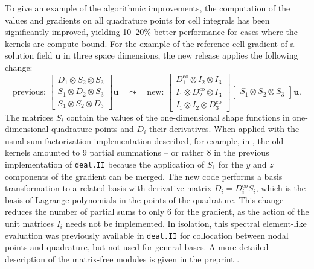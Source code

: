 \documentclass{ansarticle-preprint}
\newcommand{\specialword}[1]{\texttt{#1}}
\newcommand{\dealii}{{\specialword{deal.II}}\xspace}
\begin{document}
To give an example of the algorithmic improvements, the computation of the
values and gradients on all quadrature points for cell integrals has been
significantly improved, yielding 10--20\% better performance for cases where
the kernels are compute bound. For the example of the reference cell gradient
of a solution field $\mathbf u$ in three space dimensions, the new release
applies the following change:
\begin{equation*}
  \text{previous: }
  \begin{bmatrix}
    D_{1} \otimes S_{2} \otimes S_{3}\\
    S_{1} \otimes D_{2} \otimes S_{3}\\
    S_{1} \otimes S_{2} \otimes D_{3}
  \end{bmatrix}
  \mathbf u
  \quad
  \leadsto
  \quad
  \text{new: }
  \begin{bmatrix}
    D_{1}^{\mathrm{co}} \otimes I_{2} \otimes I_{3}\\
    I_{1} \otimes D_{2}^{\mathrm{co}} \otimes I_{3}\\
    I_{1} \otimes I_{2} \otimes D_{3}^{\mathrm{co}}
  \end{bmatrix}
  \begin{bmatrix}
    S_{1} \otimes S_{2} \otimes S_{3}
  \end{bmatrix}
  \mathbf u.
\end{equation*}
The matrices $S_i$ contain the values of the one-dimensional shape functions
in one-dimensional quadrature points and $D_i$ their derivatives. When applied
with the usual sum factorization implementation described, for
example, in
\cite{KronbichlerKormann2012}, the old kernels amounted to 9 partial
summations -- or rather 8 in the previous implementation of \dealii{} because
the application of $S_1$ for the $y$ and $z$ components of the gradient can be
merged. The new code performs a basis transformation to a related basis with
derivative matrix $D_i = D_i^{\mathrm{co}} S_i$, which is the basis of
Lagrange polynomials in the points of the quadrature. This change reduces the
number of partial sums to only 6 for the gradient, as the action of the unit
matrices $I_i$ needs not be implemented. In isolation, this spectral
element-like evaluation was previously available in \dealii{} for collocation
between nodal points and quadrature, but not used for general bases. A more
detailed description of the matrix-free modules is given in the preprint
\cite{KronbichlerKormann2017}.


\end{document}
